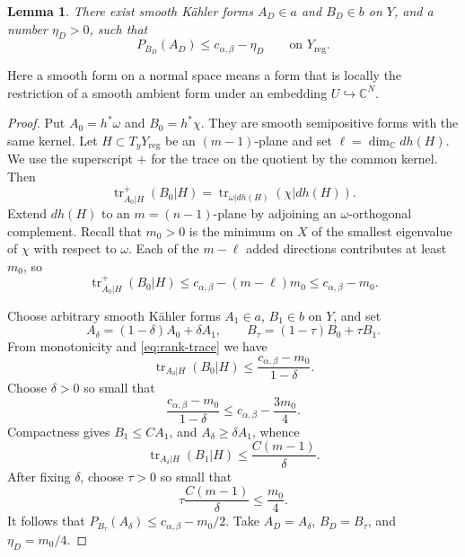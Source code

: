 \documentclass[reqno]{amsart}
\newcommand{\tr}{\operatorname{tr}}
\newcommand{\cab}{c_{\alpha,\beta}}
\newcommand{\reg}{\mathrm{reg}}
\theoremstyle{plain}
\newtheorem{lemma}[thm]{Lemma}
\theoremstyle{remark}
\begin{document}
\begin{lemma}
\label{lem:normal-subsolution}
There exist smooth K\"ahler forms $A_D\in a$ and $B_D\in b$ on $Y$,
and a number $\eta_D>0$, such that
\begin{equation}\label{eq:normal-strict}
 P_{B_D}(A_D)\leq\cab-\eta_D
 \qquad\text{on }Y_{\reg}.
\end{equation}
\end{lemma}
Here a smooth form on a normal space means a form that is locally the
restriction of a smooth ambient form under an embedding
$U\hookrightarrow\mathbb C^N$. 
\begin{proof}
Put $A_0=h^*\omega$ and $B_0=h^*\chi$.  They are smooth
semipositive forms with the same kernel.  Let $H\subset T_yY_{\reg}$
be an $(m-1)$-plane and set
$\ell=\dim_\mathbb C dh(H)$. We use the superscript $+$ for the
trace on the quotient by the common kernel. Then
\[
 \tr^+_{A_0|H}(B_0|H)
 =
 \tr_{\omega|dh(H)}(\chi|dh(H)).
\]
Extend $dh(H)$ to an $m=(n-1)$-plane by adjoining an
$\omega$-orthogonal complement. Recall that
$m_0>0$ is the minimum on $X$ of the smallest eigenvalue of $\chi$
with respect to $\omega$. Each of the $m-\ell$ added directions
contributes at least $m_0$, so
\begin{equation}\label{eq:rank-trace}
 \tr^+_{A_0|H}(B_0|H)
 \leq\cab-(m-\ell)m_0\leq\cab-m_0.
\end{equation}

Choose arbitrary smooth K\"ahler forms $A_1\in a$, $B_1\in b$
on $Y$, and set
\[
 A_\delta=(1-\delta)A_0+\delta A_1,\qquad
 B_\tau=(1-\tau)B_0+\tau B_1.
\]
From monotonicity and \eqref{eq:rank-trace} we have
\[
 \tr_{A_\delta|H}(B_0|H)
 \leq\frac{\cab-m_0}{1-\delta}.
\]
Choose $\delta>0$ so small that
\[
 \frac{\cab-m_0}{1-\delta}\leq\cab-\frac{3m_0}{4}.
\]
Compactness gives $B_1\leq CA_1$, and
$A_\delta\geq\delta A_1$, whence
\[
 \tr_{A_\delta|H}(B_1|H)
 \leq\frac{C(m-1)}{\delta}.
\]
After fixing $\delta$, choose $\tau>0$ so small that
\[
 \tau\frac{C(m-1)}{\delta}\leq\frac{m_0}{4}.
\]
It follows that $P_{B_\tau}(A_\delta)\leq\cab-m_0/2$.
Take $A_D=A_\delta$, $B_D=B_\tau$, and
$\eta_D=m_0/4$.
\end{proof}
\end{document}
